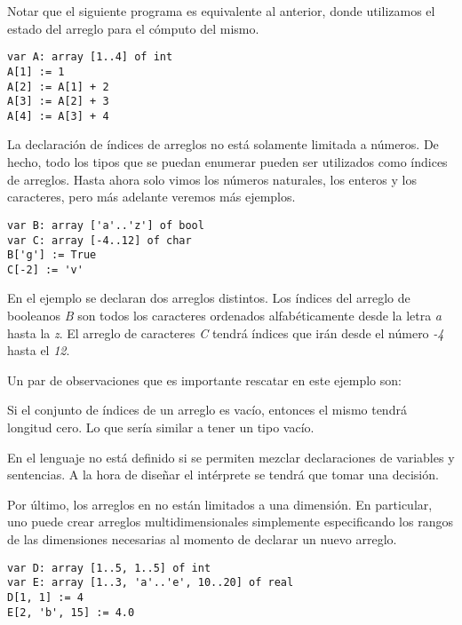 \documentclass{article}
\begin{document}
Notar que el siguiente programa es equivalente al anterior, donde utilizamos el estado del arreglo para el cómputo del mismo.

\begin{lstlisting}
var A: array [1..4] of int
A[1] := 1 
A[2] := A[1] + 2
A[3] := A[2] + 3
A[4] := A[3] + 4
\end{lstlisting}

La declaración de índices de arreglos no está solamente limitada a números.
De hecho, todo los tipos que se puedan enumerar pueden ser utilizados como índices de arreglos.
Hasta ahora solo vimos los números naturales, los enteros y los caracteres, pero más adelante veremos más ejemplos.

\begin{lstlisting}
var B: array ['a'..'z'] of bool
var C: array [-4..12] of char
B['g'] := True
C[-2] := 'v'
\end{lstlisting}

En el ejemplo se declaran dos arreglos distintos.
Los índices del arreglo de booleanos \textit{B} son todos los caracteres ordenados alfabéticamente desde la letra \textit{a} hasta la \textit{z}.
El arreglo de caracteres  \textit{C} tendrá índices que irán desde el número \textit{-4} hasta el \textit{12}.

Un par de observaciones que es importante rescatar en este ejemplo son:
\begin{enumerate*}
\item Si el conjunto de índices de un arreglo es vacío, entonces el mismo tendrá longitud cero. Lo que sería similar a tener un tipo vacío.
\item En el lenguaje no está definido si se permiten mezclar declaraciones de variables y sentencias. A la hora de diseñar el intérprete se tendrá que tomar una decisión.
\end{enumerate*}

Por último, los arreglos en \Lang\space no están limitados a una dimensión.
En particular, uno puede crear arreglos multidimensionales simplemente especificando los rangos de las dimensiones necesarias al momento de declarar un nuevo arreglo.

\begin{lstlisting}
var D: array [1..5, 1..5] of int
var E: array [1..3, 'a'..'e', 10..20] of real
D[1, 1] := 4
E[2, 'b', 15] := 4.0
\end{lstlisting}
\end{document}
